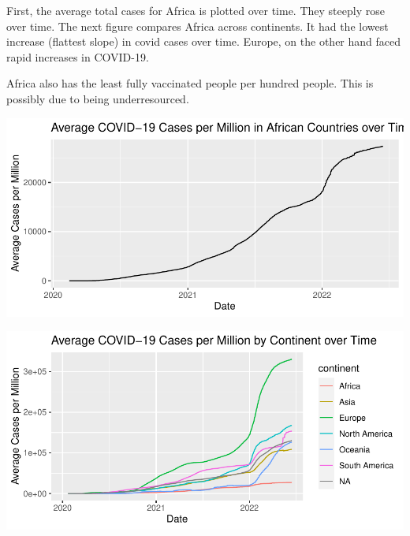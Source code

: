 \documentclass[11pt,preprint, authoryear]{elsarticle}
\let\origfigure\figure
\let\endorigfigure\endfigure
\renewenvironment{figure}[1][2] {
    \expandafter\origfigure\expandafter[H]
} {
    \endorigfigure
}
\numberwithin{equation}{section}
\numberwithin{figure}{section}
\numberwithin{table}{section}
\begin{document}
First, the average total cases for Africa is plotted over time. They
steeply rose over time. The next figure compares Africa across
continents. It had the lowest increase (flattest slope) in covid cases
over time. Europe, on the other hand faced rapid increases in COVID-19.

Africa also has the least fully vaccinated people per hundred people.
This is possibly due to being underresourced.

\begin{figure}[H]

{\centering \includegraphics{Q1_files/figure-latex/Figure1-1} 

}

\caption{Caption Here \label{Figure1}}\label{fig:Figure1-1}
\end{figure}
\begin{figure}[H]

{\centering \includegraphics{Q1_files/figure-latex/Figure1-2} 

}

\caption{Caption Here \label{Figure1}}\label{fig:Figure1-2}
\end{figure}
\end{document}
